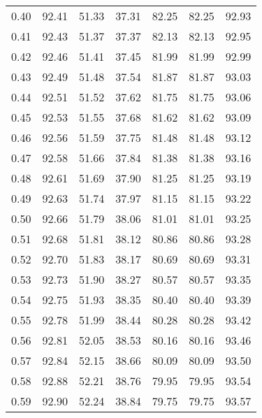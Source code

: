 \begin{tabular}{|c|c|c|c|c|c|c|}
      0.40 &     92.41 &     51.33 &      37.31 &   82.25 &      82.25 &         92.93 \\
      0.41 &     92.43 &     51.37 &      37.37 &   82.13 &      82.13 &         92.95 \\
      0.42 &     92.46 &     51.41 &      37.45 &   81.99 &      81.99 &         92.99 \\
      0.43 &     92.49 &     51.48 &      37.54 &   81.87 &      81.87 &         93.03 \\
      0.44 &     92.51 &     51.52 &      37.62 &   81.75 &      81.75 &         93.06 \\
      0.45 &     92.53 &     51.55 &      37.68 &   81.62 &      81.62 &         93.09 \\
      0.46 &     92.56 &     51.59 &      37.75 &   81.48 &      81.48 &         93.12 \\
      0.47 &     92.58 &     51.66 &      37.84 &   81.38 &      81.38 &         93.16 \\
      0.48 &     92.61 &     51.69 &      37.90 &   81.25 &      81.25 &         93.19 \\
      0.49 &     92.63 &     51.74 &      37.97 &   81.15 &      81.15 &         93.22 \\
      0.50 &     92.66 &     51.79 &      38.06 &   81.01 &      81.01 &         93.25 \\
      0.51 &     92.68 &     51.81 &      38.12 &   80.86 &      80.86 &         93.28 \\
      0.52 &     92.70 &     51.83 &      38.17 &   80.69 &      80.69 &         93.31 \\
      0.53 &     92.73 &     51.90 &      38.27 &   80.57 &      80.57 &         93.35 \\
      0.54 &     92.75 &     51.93 &      38.35 &   80.40 &      80.40 &         93.39 \\
      0.55 &     92.78 &     51.99 &      38.44 &   80.28 &      80.28 &         93.42 \\
      0.56 &     92.81 &     52.05 &      38.53 &   80.16 &      80.16 &         93.46 \\
      0.57 &     92.84 &     52.15 &      38.66 &   80.09 &      80.09 &         93.50 \\
      0.58 &     92.88 &     52.21 &      38.76 &   79.95 &      79.95 &         93.54 \\
      0.59 &     92.90 &     52.24 &      38.84 &   79.75 &      79.75 &         93.57 \\

\end{tabular}
